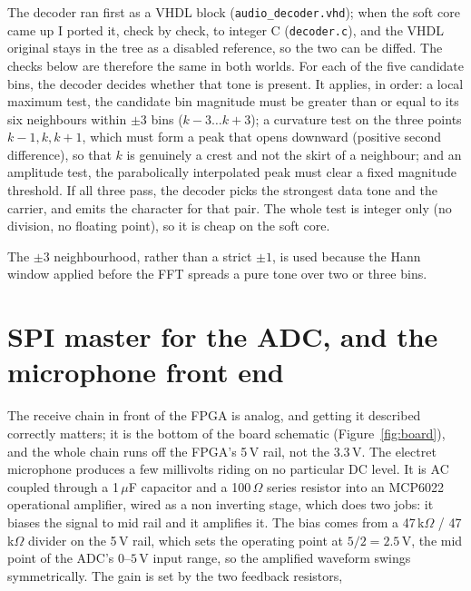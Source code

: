 \documentclass[a4paper,11pt]{article}
\begin{document}
The decoder ran first as a VHDL block (\texttt{audio\_decoder.vhd}); when the
soft core came up I ported it, check by check, to integer C
(\texttt{decoder.c}), and the VHDL original stays in the tree as a disabled
reference, so the two can be diffed. The checks below are therefore the same in
both worlds. For each of the five candidate bins, the decoder decides whether that tone is
present. It applies, in order: a local maximum test, the candidate bin magnitude
must be greater than or equal to its six neighbours within $\pm 3$ bins
($k\!-\!3 \dots k\!+\!3$); a curvature test on the three points $k\!-\!1, k, k\!+\!1$,
which must form a peak that opens downward (positive second difference), so that $k$
is genuinely a crest and not the skirt of a neighbour; and an amplitude test, the
parabolically interpolated peak must clear a fixed magnitude threshold. If all three
pass, the decoder picks the strongest data tone and the carrier, and emits the
character for that pair. The whole test is integer only (no division, no floating
point), so it is cheap on the soft core.

The $\pm 3$ neighbourhood, rather than a strict $\pm 1$, is used because the Hann
window applied before the FFT spreads a pure tone over two or three bins.

\section{SPI master for the ADC, and the microphone front end}
\label{sec:adc}

The receive chain in front of the FPGA is analog, and getting it described
correctly matters; it is the bottom of the board schematic (Figure~\ref{fig:board}),
and the whole chain runs off the FPGA's 5\,V rail, not the 3.3\,V. The electret
microphone produces a few millivolts riding on no particular DC level. It is AC
coupled through a 1\,$\mu$F capacitor and a 100\,$\Omega$ series resistor into an
MCP6022 operational amplifier, wired as a non inverting stage, which does two jobs:
it biases the signal to mid rail and it amplifies it. The bias comes from a
47\,k$\Omega$ / 47\,k$\Omega$ divider on the 5\,V rail, which sets the operating
point at $5/2 = 2.5\,\mathrm{V}$, the mid point of the ADC's $0$--$5$\,V input
range, so the amplified waveform swings symmetrically. The gain is set by the two
feedback resistors,
\end{document}

